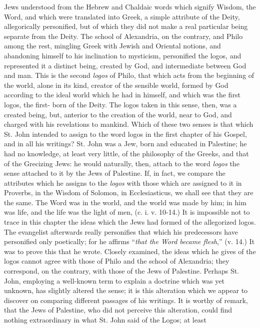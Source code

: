 {Jews understood from the Hebrew and Chaldaic words which signify
Wisdom, the Word, and which were translated into Greek, a simple
attribute of the Deity, allegorically personified, but of which
they did not make a real particular being separate from the
Deity.
The school of Alexandria, on the contrary, and Philo among
the rest, mingling Greek with Jewish and Oriental notions,
and abandoning himself to his inclination to mysticism,
personified the logos, and represented it a distinct being,
created by God, and intermediate between God and man. This is
the second \textit{logos} of Philo, that which acts from the
beginning of the world, alone in its kind, creator of the
sensible world, formed by God according to the ideal world
which he had in himself, and which was the first logos, the
first- born of the Deity. The logos taken in this sense,
then, was a created being, but, anterior to the creation of
the world, near to God, and charged with his revelations to
mankind.
Which of these two senses is that which St. John intended to
assign to the word logos in the first chapter of his Gospel,
and in all his writings? St. John was a Jew, born and
educated in Palestine; he had no knowledge, at least very
little, of the philosophy of the Greeks, and that of the
Grecizing Jews: he would naturally, then, attach to the word
\textit{logos} the sense attached to it by the Jews of Palestine.
If, in fact, we compare the attributes which he assigns to
the \textit{logos} with those which are assigned to it in Proverbs,
in the Wisdom of Solomon, in Ecclesiasticus, we shall see
that they are the same. The Word was in the world, and the
world was made by him; in him was life, and the life was the
light of men, (c. i. v. 10-14.) It is impossible not to trace
in this chapter the ideas which the Jews had formed of the
allegorized logos. The evangelist afterwards really
personifies that which his predecessors have personified only
poetically; for he affirms “\textit{that the Word became flesh},”
(v. 14.) It was to prove this that he wrote. Closely
examined, the ideas which he gives of the logos cannot agree
with those of Philo and the school of Alexandria; they
correspond, on the contrary, with those of the Jews of
Palestine. Perhaps St. John, employing a well-known term to
explain a doctrine which was yet unknown, has slightly
altered the sense; it is this alteration which we appear to
discover on comparing different passages of his writings.
It is worthy of remark, that the Jews of Palestine, who did
not perceive this alteration, could find nothing
extraordinary in what St. John said of the Logos; at least
}
